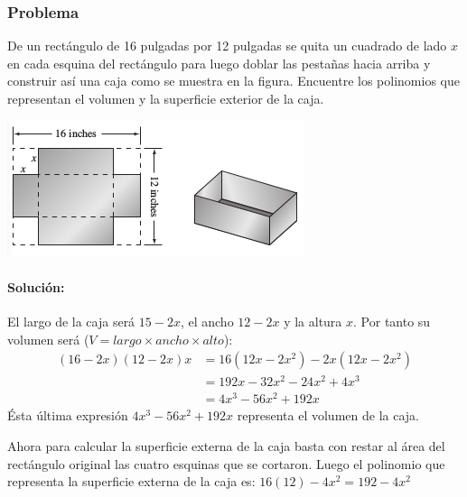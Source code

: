 \documentclass[10pt,twoside]{article}
\begin{document}
\subsubsection*{Problema}
De un rectángulo de 16 pulgadas por 12 pulgadas se quita un cuadrado de lado $x$ en cada esquina del rectángulo para luego doblar las pestañas hacia arriba y construir así una caja como se muestra en la figura. Encuentre los polinomios que representan el volumen y la superficie exterior de la caja.
\begin{center}
\includegraphics[scale=.75]{Images/caja_12in.png} 
\end{center}
\paragraph*{Solución:}

El largo de la caja será $15-2x$, el ancho $12-2x$ y la altura $x$. Por tanto su volumen será ($V=largo\times ancho \times alto$):
\begin{align*}
(16-2x)(12-2x)x&=16(12x-2x^2)-2x(12x-2x^2)\\
&=192x-32x^2-24x^2+4x^3\\
&=4x^3-56x^2+192x
\end{align*}
Ésta última expresión $4x^3-56x^2+192x$ representa el volumen de la caja.

Ahora para calcular la superficie externa de la caja basta con restar al área del rectángulo original las cuatro esquinas que se cortaron. Luego el polinomio que representa la superficie externa de la caja es: 
$16(12)-4x^2=192-4x^2$
\end{document}
